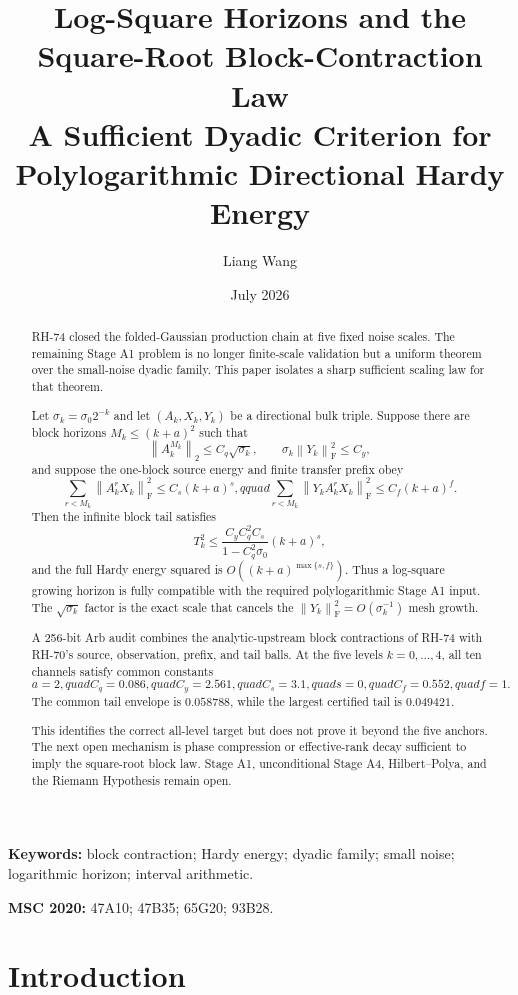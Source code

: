 \documentclass[11pt]{article}
\title{Log-Square Horizons and the Square-Root Block-Contraction Law\\
\large A Sufficient Dyadic Criterion for Polylogarithmic Directional Hardy Energy}
\author{Liang Wang}
\date{July 2026}
\newcommand{\norm}[1]{\left\lVert#1\right\rVert}
\newcommand{\F}{\mathrm F}
\begin{document}
\maketitle

\begin{abstract}
RH-74 closed the folded-Gaussian production chain at five fixed noise scales.
The remaining Stage A1 problem is no longer finite-scale validation but a
uniform theorem over the small-noise dyadic family.  This paper isolates a
sharp sufficient scaling law for that theorem.

Let $\sigma_k=\sigma_0 2^{-k}$ and let $(A_k,X_k,Y_k)$ be a directional bulk
triple.  Suppose there are block horizons $M_k\le(k+a)^2$ such that
\[
 \norm{A_k^{M_k}}_2\le C_q\sqrt{\sigma_k},\qquad
 \sigma_k\norm{Y_k}_{\F}^2\le C_y,
\]
and suppose the one-block source energy and finite transfer prefix obey
\[
 \sum_{r<M_k}\norm{A_k^rX_k}_{\F}^2
 \le C_s(k+a)^s,qquad
 \sum_{r<M_k}\norm{Y_kA_k^rX_k}_{\F}^2
 \le C_f(k+a)^f.
\]
Then the infinite block tail satisfies
\[
 T_k^2\le
 \frac{C_yC_q^2C_s}{1-C_q^2\sigma_0}(k+a)^s,
\]
and the full Hardy energy squared is
$O((k+a)^{\max\{s,f\}})$.  Thus a log-square growing horizon is fully
compatible with the required polylogarithmic Stage A1 input.  The
$\sqrt{\sigma_k}$ factor is the exact scale that cancels the
$\norm{Y_k}_{\F}^2=O(\sigma_k^{-1})$ mesh growth.

A 256-bit Arb audit combines the analytic-upstream block contractions of
RH-74 with RH-70's source, observation, prefix, and tail balls.  At the five
levels $k=0,\dots,4$, all ten channels satisfy common constants
\[
 a=2,quad C_q=0.086,quad C_y=2.561,quad C_s=3.1,quad
 s=0,quad C_f=0.552,quad f=1.
\]
The common tail envelope is $0.058788$, while the largest certified tail is
$0.049421$.

This identifies the correct all-level target but does not prove it beyond the
five anchors.  The next open mechanism is phase compression or effective-rank
decay sufficient to imply the square-root block law.  Stage A1, unconditional
Stage A4, Hilbert--Polya, and the Riemann Hypothesis remain open.
\end{abstract}

\noindent\textbf{Keywords:} block contraction; Hardy energy; dyadic family;
small noise; logarithmic horizon; interval arithmetic.

\medskip
\noindent\textbf{MSC 2020:} 47A10; 47B35; 65G20; 93B28.

\section{Introduction}
\end{document}
